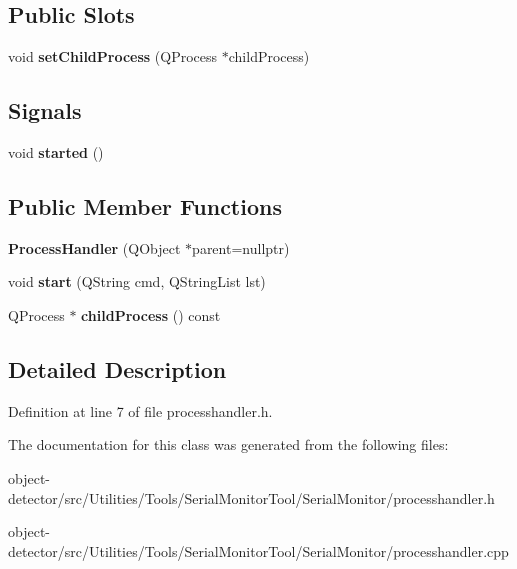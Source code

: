 \subsection*{Public Slots}
\begin{DoxyCompactItemize}
\item 
\mbox{\label{class_process_handler_a2b193425b4019950cb6a6107bc77818a}} 
void {\bfseries set\+Child\+Process} (Q\+Process $\ast$child\+Process)
\end{DoxyCompactItemize}
\subsection*{Signals}
\begin{DoxyCompactItemize}
\item 
\mbox{\label{class_process_handler_a39360c3b31efc537cc2ea1e7146a5199}} 
void {\bfseries started} ()
\end{DoxyCompactItemize}
\subsection*{Public Member Functions}
\begin{DoxyCompactItemize}
\item 
\mbox{\label{class_process_handler_ac10d955bb2b0a0b9a13c769fe4ee7c95}} 
{\bfseries Process\+Handler} (Q\+Object $\ast$parent=nullptr)
\item 
\mbox{\label{class_process_handler_a28eb04349379ab2d6a6fc5836eecea45}} 
void {\bfseries start} (Q\+String cmd, Q\+String\+List lst)
\item 
\mbox{\label{class_process_handler_afba00d9437090c8fedd4fc8fa0c84813}} 
Q\+Process $\ast$ {\bfseries child\+Process} () const
\end{DoxyCompactItemize}


\subsection{Detailed Description}


Definition at line 7 of file processhandler.\+h.



The documentation for this class was generated from the following files\+:\begin{DoxyCompactItemize}
\item 
object-\/detector/src/\+Utilities/\+Tools/\+Serial\+Monitor\+Tool/\+Serial\+Monitor/processhandler.\+h\item 
object-\/detector/src/\+Utilities/\+Tools/\+Serial\+Monitor\+Tool/\+Serial\+Monitor/processhandler.\+cpp\end{DoxyCompactItemize}

